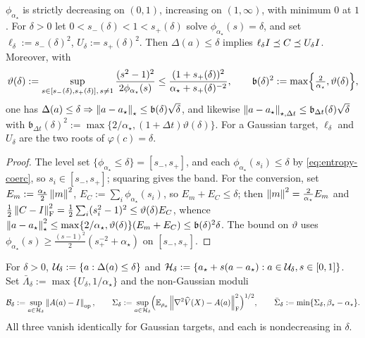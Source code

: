 \begin{corollary}
\label{cor:band}
$\phi_{\alpha_\star}$ is strictly decreasing on $(0,1)$, increasing on $(1,\infty)$, with
minimum $0$ at $1$. For $\delta>0$ let $0<s_-(\delta)<1<s_+(\delta)$ solve
$\phi_{\alpha_\star}(s)=\delta$, and set $\ell_\delta:=s_-(\delta)^2$,
$U_\delta:=s_+(\delta)^2$. Then $\Delta(a)\leq\delta$ implies
$\ell_\delta I\preceq C\preceq U_\delta I$. Moreover, with
\[
    \vartheta(\delta):=\sup_{s\in[s_-(\delta),s_+(\delta)],\,s\neq1}\frac{(s^2-1)^2}{2\phi_{\alpha_\star}(s)}
    \leq\frac{(1+s_+(\delta))^2}{\alpha_\star+s_+(\delta)^{-2}},
    \qquad
    \mathfrak b(\delta)^2:=\max\Bigl\{\tfrac2{\alpha_\star},\vartheta(\delta)\Bigr\},
\]
one has $\Delta(a)\leq\delta\Rightarrow\left\lVert a-a_\star\right\rVert_\star\leq\mathfrak b(\delta)\sqrt\delta$,
and likewise $\left\lVert a-a_\star\right\rVert_{\star,\Delta t}\leq\mathfrak b_{\Delta t}(\delta)\sqrt\delta$
with $\mathfrak b_{\Delta t}(\delta)^2:=\max\{2/\alpha_\star,(1+\Delta t)\vartheta(\delta)\}$.
For a Gaussian target, $\ell_\delta$ and $U_\delta$ are the two roots of $\varphi(c)=\delta$.
\end{corollary}

\begin{proof}
The level set $\{\phi_{\alpha_\star}\leq\delta\}=[s_-,s_+]$, and each $\phi_{\alpha_\star}(s_i)\leq\delta$
by \eqref{eq:entropy-coerc}, so $s_i\in[s_-,s_+]$; squaring gives the band. For the
conversion, set $E_m:=\tfrac{\alpha_\star}2\left\lVert m\right\rVert^2$, $E_C:=\sum_i\phi_{\alpha_\star}(s_i)$,
so $E_m+E_C\leq\delta$; then $\left\lVert m\right\rVert^2=\tfrac2{\alpha_\star}E_m$ and
$\tfrac12\left\lVert C-I\right\rVert_{\mathrm{F}}^2=\tfrac12\sum_i(s_i^2-1)^2\leq\vartheta(\delta)E_C$, whence
$\left\lVert a-a_\star\right\rVert_\star^2\leq\max\{2/\alpha_\star,\vartheta(\delta)\}(E_m+E_C)\leq\mathfrak b(\delta)^2\delta$.
The bound on $\vartheta$ uses $\phi_{\alpha_\star}(s)\geq\tfrac{(s-1)^2}2(s_+^{-2}+\alpha_\star)$
on $[s_-,s_+]$.
\end{proof}

\begin{definition}
\label{def:region}
For $\delta>0$, $\mathcal{U}_\delta:=\{a:\Delta(a)\leq\delta\}$ and
$\mathcal{H}_\delta:=\{a_\star+s(a-a_\star):a\in\mathcal{U}_\delta,s\in[0,1]\}$. Set
$\bar\Lambda_\delta:=\max\{U_\delta,1/\alpha_\star\}$ and the non-Gaussian moduli
\[
    \mathcal B_\delta:=\sup_{a\in\mathcal{H}_\delta}\left\lVert A(a)-I\right\rVert_{\mathrm{op}},
    \qquad
    \Sigma_\delta:=\sup_{a\in\mathcal{H}_\delta}\Bigl(\mathbb{E}_{\rho_a}\left\lVert \nabla^2\widehat V(X)-A(a)\right\rVert_{\mathrm{F}}^2\Bigr)^{1/2},
    \qquad
    \bar\Sigma_\delta:=\min\{\Sigma_\delta,\beta_\star-\alpha_\star\}.
\]
All three vanish identically for Gaussian targets, and each is nondecreasing in $\delta$.
\end{definition}

